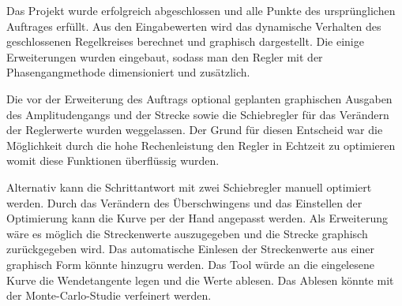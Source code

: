Das   Projekt   wurde   erfolgreich   abgeschlossen  und   alle   Punkte   des
urspr\"unglichen   Auftrages  erf\"ullt. Aus   den   Eingabewerten  wird   das
dynamische Verhalten  des geschlossenen  Regelkreises berechnet  und graphisch
dargestellt. Die einige Erweiterungen wurden  eingebaut, sodass man den Regler
mit der Phasengangmethode dimensioniert und zus\"atzlich.


Die vor der  Erweiterung des Auftrags optional  geplanten graphischen Ausgaben
des  Amplitudengangs  und  der  Strecke   sowie  die  Schiebregler  f\"ur  das
Ver\"andern  der  Reglerwerte  wurden   weggelassen. Der  Grund  f\"ur  diesen
Entscheid war  die M\"oglichkeit durch  die hohe Rechenleistung den  Regler in
Echtzeit zu optimieren womit diese Funktionen \"uberfl\"ussig wurden.


Alternativ  kann die  Schrittantwort mit  zwei Schiebregler  manuell optimiert
werden. Durch  das Ver\"andern  des  \"Uberschwingens und  das Einstellen  der
Optimierung kann  die Kurve  per der Hand  angepasst werden.   Als Erweiterung
w\"are es m\"oglich  die Streckenwerte auszugegeben und  die Strecke graphisch
zur\"uckgegeben wird. Das  automatische Einlesen  der Streckenwerte  aus einer
graphisch Form k\"onnte hinzugru\“ werden. Das Tool w\"urde an die eingelesene
Kurve die Wendetangente legen und  die Werte ablesen. Das Ablesen k\"onnte mit
der Monte-Carlo-Studie verfeinert werden.
